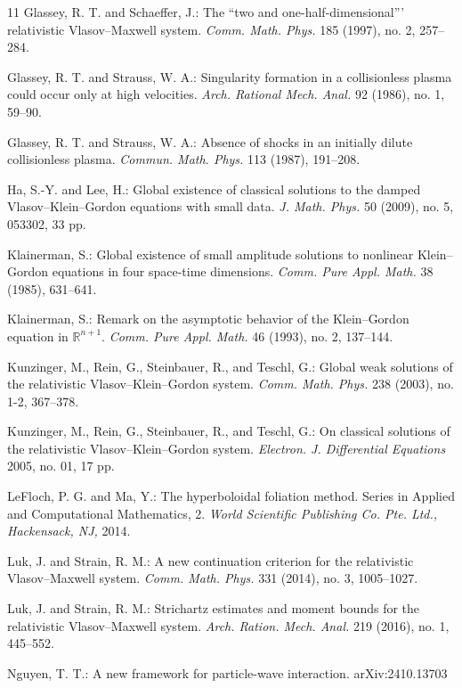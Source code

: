 \documentclass{article}
\newcommand{\bbr}{{\mathbb R}}
\begin{document}
\begin{thebibliography}{11}
 Glassey, R. T. and Schaeffer, J.:
The ``two and one-half-dimensional''' relativistic Vlasov--Maxwell system.
{\it Comm. Math. Phys.} 185 (1997), no. 2, 257--284. 
 
 Glassey, R. T. and Strauss, W. A.:
Singularity formation in a collisionless plasma could occur only at high velocities.
{\it Arch. Rational Mech. Anal.} 92 (1986), no. 1, 59--90.
 
 Glassey, R. T. and Strauss, W. A.:
Absence of shocks in an initially dilute collisionless plasma.
{\it Commun. Math. Phys.} 113 (1987), 191--208.

 Ha, S.-Y. and Lee, H.:
Global existence of classical solutions to the damped Vlasov--Klein--Gordon equations with small data.
{\it J. Math. Phys.} 50 (2009), no. 5, 053302, 33 pp.

 Klainerman, S.:
Global existence of small amplitude solutions to nonlinear Klein--Gordon equations in four space-time dimensions.
{\it Comm. Pure Appl. Math.} 38 (1985), 631--641.

 Klainerman, S.:
Remark on the asymptotic behavior of the Klein--Gordon equation in $ \bbr^{ n + 1 } $. 
{\it Comm. Pure Appl. Math.} 46 (1993), no. 2, 137--144.

 Kunzinger, M., Rein, G., Steinbauer, R., and Teschl, G.:
Global weak solutions of the relativistic Vlasov--Klein--Gordon system.
{\it Comm. Math. Phys.} 238 (2003), no. 1-2, 367--378.

 Kunzinger, M., Rein, G., Steinbauer, R., and Teschl, G.:
On classical solutions of the relativistic Vlasov--Klein--Gordon system.
{\it Electron. J. Differential Equations} 2005, no. 01, 17 pp.

 LeFloch, P. G. and Ma, Y.:
The hyperboloidal foliation method.
Series in Applied and Computational Mathematics, 2. {\it World Scientific Publishing Co. Pte. Ltd., Hackensack, NJ,} 2014. 

 Luk, J. and Strain, R. M.:
A new continuation criterion for the relativistic Vlasov--Maxwell system.
{\it Comm. Math. Phys.} 331 (2014), no. 3, 1005--1027. 

 Luk, J. and Strain, R. M.:
Strichartz estimates and moment bounds for the relativistic Vlasov--Maxwell system.
{\it Arch. Ration. Mech. Anal.} 219 (2016), no. 1, 445--552.

 Nguyen, T. T.:
A new framework for particle-wave interaction.
arXiv:2410.13703


\end{thebibliography}
\end{document}
